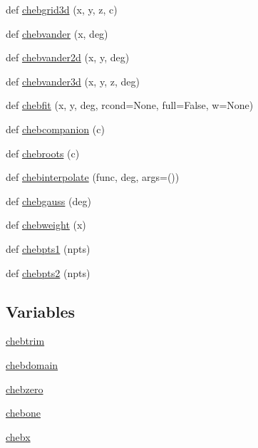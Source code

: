\begin{DoxyCompactItemize}
\item 
def \hyperlink{namespacenumpy_1_1polynomial_1_1chebyshev_aadfffe8cca7e1d020028df4e6ef8220d}{chebgrid3d} (x, y, z, c)
\item 
def \hyperlink{namespacenumpy_1_1polynomial_1_1chebyshev_a828f268d8b8eb17c66ea6da3c94cebc4}{chebvander} (x, deg)
\item 
def \hyperlink{namespacenumpy_1_1polynomial_1_1chebyshev_a21a06d01240e81ecfacfb886a19a20e8}{chebvander2d} (x, y, deg)
\item 
def \hyperlink{namespacenumpy_1_1polynomial_1_1chebyshev_ad1cc7eced1767129b617b3461bc0752a}{chebvander3d} (x, y, z, deg)
\item 
def \hyperlink{namespacenumpy_1_1polynomial_1_1chebyshev_ad31c969df42978e2e24e975b835e1674}{chebfit} (x, y, deg, rcond=None, full=False, w=None)
\item 
def \hyperlink{namespacenumpy_1_1polynomial_1_1chebyshev_a3a4cf8a6d01561f6fc9e83a4a7641d4a}{chebcompanion} (c)
\item 
def \hyperlink{namespacenumpy_1_1polynomial_1_1chebyshev_a2ae2563bc0a4f56421d9c39006e6009c}{chebroots} (c)
\item 
def \hyperlink{namespacenumpy_1_1polynomial_1_1chebyshev_a33e9bef786d32c0eef893c68dd34fa09}{chebinterpolate} (func, deg, args=())
\item 
def \hyperlink{namespacenumpy_1_1polynomial_1_1chebyshev_ab8fd48a4bae89d0481f5fb27ac8116a8}{chebgauss} (deg)
\item 
def \hyperlink{namespacenumpy_1_1polynomial_1_1chebyshev_a5678577142c267addada7b0ccec27407}{chebweight} (x)
\item 
def \hyperlink{namespacenumpy_1_1polynomial_1_1chebyshev_ae301bf9cbe60a1e030d755e972831fcb}{chebpts1} (npts)
\item 
def \hyperlink{namespacenumpy_1_1polynomial_1_1chebyshev_a600cdccc553203b663ebdaa43663d8f2}{chebpts2} (npts)
\end{DoxyCompactItemize}
\subsection*{Variables}
\begin{DoxyCompactItemize}
\item 
\hyperlink{namespacenumpy_1_1polynomial_1_1chebyshev_a0c07d2262c9211fcc94243c9a0ff0bc3}{chebtrim}
\item 
\hyperlink{namespacenumpy_1_1polynomial_1_1chebyshev_a240386220c18d9c518e66890b72aba24}{chebdomain}
\item 
\hyperlink{namespacenumpy_1_1polynomial_1_1chebyshev_aead7a4c3991a27f9ea4871cc751febe0}{chebzero}
\item 
\hyperlink{namespacenumpy_1_1polynomial_1_1chebyshev_a5101550f57e64c08406bf41524809413}{chebone}
\item 
\hyperlink{namespacenumpy_1_1polynomial_1_1chebyshev_af2f9254dd8f6750ab73a00be99963448}{chebx}
\end{DoxyCompactItemize}



